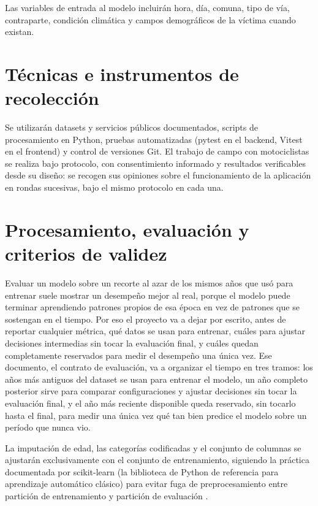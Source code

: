 Las variables de entrada al modelo incluirán hora, día, comuna, tipo de
vía, contraparte, condición climática y campos demográficos de la
víctima cuando existan.

\section{Técnicas e instrumentos de recolección}

Se utilizarán datasets y servicios públicos documentados, scripts de
procesamiento en Python, pruebas automatizadas (pytest en el backend,
Vitest en el frontend) y control de versiones Git. El trabajo de campo
con motociclistas se realiza bajo protocolo, con consentimiento
informado y resultados verificables desde su diseño: se recogen sus
opiniones sobre el funcionamiento de la aplicación en rondas sucesivas,
bajo el mismo protocolo en cada una.

\section{Procesamiento, evaluación y criterios de validez}

Evaluar un modelo sobre un recorte al azar de los mismos años que usó
para entrenar suele mostrar un desempeño mejor al real, porque el modelo
puede terminar aprendiendo patrones propios de esa época en vez de
patrones que se sostengan en el tiempo. Por eso el proyecto va a dejar
por escrito, antes de reportar cualquier métrica, qué datos se usan para
entrenar, cuáles para ajustar decisiones intermedias sin tocar la
evaluación final, y cuáles quedan completamente reservados para medir el
desempeño una única vez. Ese documento, el contrato de evaluación, va a
organizar el tiempo en tres tramos: los años más antiguos del dataset se
usan para entrenar el modelo, un año completo posterior sirve para
comparar configuraciones y ajustar decisiones sin tocar la evaluación
final, y el año más reciente disponible queda reservado, sin tocarlo
hasta el final, para medir una única vez qué tan bien predice el modelo
sobre un período que nunca vio.

La imputación de edad, las categorías codificadas y el conjunto de
columnas se ajustarán exclusivamente con el conjunto de entrenamiento,
siguiendo la práctica documentada por scikit-learn (la biblioteca de
Python de referencia para aprendizaje automático clásico) para evitar
fuga de preprocesamiento entre partición de entrenamiento y partición de
evaluación \citep{sklearndocs}.

